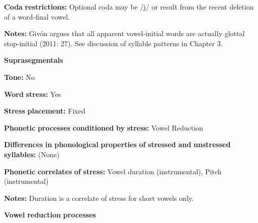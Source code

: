 \begin{styleBody}
\textbf{Coda} \textbf{restrictions:} Optional coda may be /j/ or result from the recent deletion of a word-final vowel. 
\end{styleBody}

\begin{styleBody}
\textbf{Notes:} Givón argues that all apparent vowel-initial words are actually glottal stop-initial (2011: 27). See discussion of syllable patterns in Chapter 3.
\end{styleBody}

\begin{styleBody}
\textbf{Suprasegmentals}
\end{styleBody}

\begin{styleBody}
\textbf{Tone:} No
\end{styleBody}

\begin{styleBody}
\textbf{Word} \textbf{stress:} Yes
\end{styleBody}

\begin{styleBody}
\textbf{Stress} \textbf{placement:} Fixed
\end{styleBody}

\begin{styleBody}
\textbf{Phonetic} \textbf{processes} \textbf{conditioned} \textbf{by} \textbf{stress:} Vowel Reduction
\end{styleBody}

\begin{styleBody}
\textbf{Differences} \textbf{in} \textbf{phonological} \textbf{properties} \textbf{of} \textbf{stressed} \textbf{and} \textbf{unstressed} \textbf{syllables:} (None)
\end{styleBody}

\begin{styleBody}
\textbf{Phonetic} \textbf{correlates} \textbf{of} \textbf{stress:} Vowel duration (instrumental), Pitch (instrumental)
\end{styleBody}

\begin{styleBody}
\textbf{Notes:} Duration is a correlate of stress for short vowels only.
\end{styleBody}

\begin{styleBody}
\textbf{Vowel} \textbf{reduction} \textbf{processes}
\end{styleBody}

